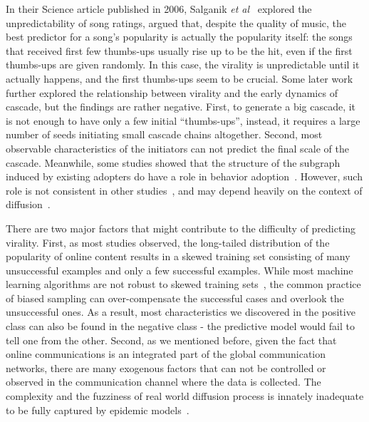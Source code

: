 \documentclass[phd,tocprelim]{cornell}
\begin{document}
In their Science article published in 2006, Salganik \emph{et al}~\cite{Salganik-2006} explored the unpredictability of song ratings, argued that, despite the quality of music, the best predictor for a song's popularity is actually the popularity itself: the songs that received first few thumbs-ups usually rise up to be the hit, even if the first thumbs-ups are given randomly. In this case, the virality is unpredictable until it actually happens, and the first thumbs-ups seem to be crucial. Some later work~\cite{Sun-2009,Bakshy-2011} further explored the relationship between virality and the early dynamics of cascade, but the findings are rather negative. First, to generate a big cascade, it is not enough to have only a few initial ``thumbs-ups'', instead, it requires a large number of seeds initiating small cascade chains altogether. Second, most observable characteristics of the initiators can not predict the final scale of the cascade.
Meanwhile, some studies showed that the structure of the subgraph induced by existing adopters do have a role in behavior adoption~\cite{Backstrom:2006,Romero-2011,Leskovec-SDM-07}. However, such role is not consistent in other studies~\cite{Bakshy-2011}, and may depend heavily on the context of diffusion~\cite{Centola:2007}.

There are two major factors that might contribute to the difficulty of predicting virality. First, as most studies observed, the long-tailed distribution of the popularity of online content results in a skewed training set consisting of many unsuccessful examples and only a few successful examples. While most machine learning algorithms are not robust to skewed training sets~\cite{Provost-2000}, the common practice of biased sampling can over-compensate the successful cases and overlook the unsuccessful ones. As a result, most characteristics we discovered in the positive class can also be found in the negative class - the predictive model would fail to tell one from the other. Second, as we mentioned before, given the fact that online communications is an integrated part of the global communication networks, there are many exogenous factors that can not be controlled or observed in the communication channel where the data is collected. The complexity and the fuzziness of real world diffusion process is innately inadequate to be fully captured by epidemic models~\cite{Bakshy-2011,Cha-2010}.
\end{document}
